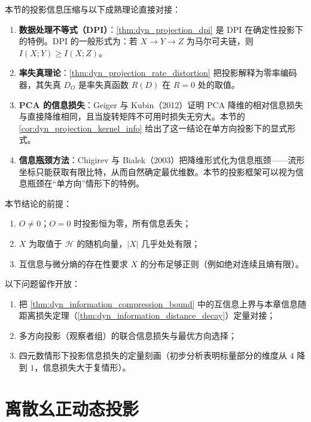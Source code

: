 \begin{remark}[与既有信息论框架的接口]\label{rem:dyn_projection_info_interface}
本节的投影信息压缩与以下成熟理论直接对接：
\begin{enumerate}[label=(\roman*)]
    \item \textbf{数据处理不等式（DPI）}：\cref{thm:dyn_projection_dpi} 是 DPI 在确定性投影下的特例。DPI 的一般形式为：若 $X\to Y\to Z$ 为马尔可夫链，则 $I(X;Y)\ge I(X;Z)$。
    \item \textbf{率失真理论}：\cref{thm:dyn_projection_rate_distortion} 把投影解释为零率编码器，其失真 $D_O$ 是率失真函数 $R(D)$ 在 $R=0$ 处的取值。
    \item \textbf{PCA 的信息损失}：Geiger 与 Kubin（2012）证明 PCA 降维的相对信息损失与直接降维相同，且当旋转矩阵不可用时损失无穷大。本节的 \cref{cor:dyn_projection_kernel_info} 给出了这一结论在单方向投影下的显式形式。
    \item \textbf{信息瓶颈方法}：Chigirev 与 Bialek（2003）把降维形式化为信息瓶颈——流形坐标只能获取有限比特，从而自然确定最优维数。本节的投影框架可以视为信息瓶颈在“单方向”情形下的特例。
\end{enumerate}
\end{remark}

\begin{remark}[适用范围与开放问题]\label{rem:dyn_projection_info_scope}
本节结论的前提：
\begin{enumerate}[label=(\roman*)]
    \item $O\neq 0$；$O=0$ 时投影恒为零，所有信息丢失；
    \item $X$ 为取值于 $\mathcal H$ 的随机向量，$|X|$ 几乎处处有限；
    \item 互信息与微分熵的存在性要求 $X$ 的分布足够正则（例如绝对连续且熵有限）。
\end{enumerate}
以下问题留作开放：
\begin{enumerate}[label=(\alph*)]
    \item 把 \cref{thm:dyn_information_compression_bound} 中的互信息上界与本章信息随距离损失定理（\cref{thm:dyn_information_distance_decay}）定量对接；
    \item 多方向投影（观察者组）的联合信息损失与最优方向选择；
    \item 四元数情形下投影信息损失的定量刻画（初步分析表明标量部分的维度从 $4$ 降到 $1$，信息损失大于复情形）。
\end{enumerate}
\end{remark}

\section{离散幺正动态投影}
\label{sec:dyn_discrete_unitary}

